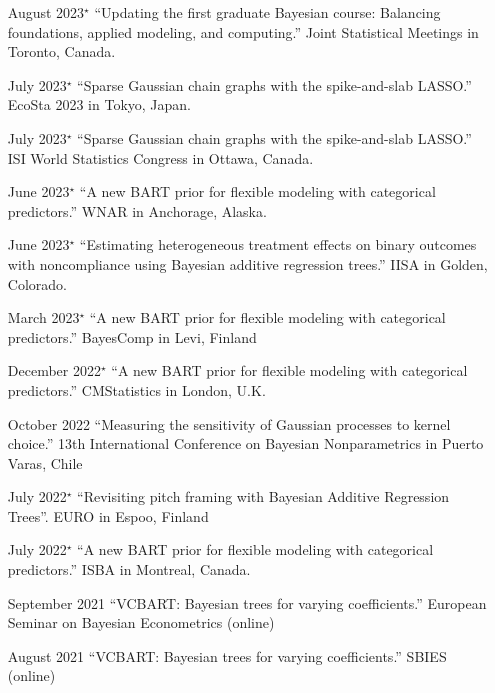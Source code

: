 \documentclass[margin]{res}
\begin{document}
\begin{resume}
\begin{itemize}
\item[August 2023$^{\star}$]{``Updating the first graduate Bayesian course: Balancing foundations, applied modeling, and computing.'' Joint Statistical Meetings in Toronto, Canada.}

\item[July 2023$^{\star}$]{``Sparse Gaussian chain graphs with the spike-and-slab LASSO.'' EcoSta 2023 in Tokyo, Japan.}

\item[July 2023$^{\star}$]{``Sparse Gaussian chain graphs with the spike-and-slab LASSO.'' ISI World Statistics Congress in Ottawa, Canada.}

\item[June 2023$^{\star}$]{``A new BART prior for flexible modeling with categorical predictors.'' WNAR in Anchorage, Alaska.}

\item[June 2023$^{\star}$]{``Estimating heterogeneous treatment effects on binary outcomes with noncompliance using Bayesian additive regression trees.'' IISA in Golden, Colorado.}

\item[March 2023$^{\star}$]{``A new BART prior for flexible modeling with categorical predictors.'' BayesComp in Levi, Finland}

\item[December 2022$^{\star}$]{``A new BART prior for flexible modeling with categorical predictors.'' CMStatistics in London, U.K.}

\item[October 2022]{``Measuring the sensitivity of Gaussian processes to kernel choice.'' 13th International Conference on Bayesian Nonparametrics in Puerto Varas, Chile}

\item[July 2022$^{\star}$]{``Revisiting pitch framing with Bayesian Additive Regression Trees''. EURO in Espoo, Finland}

\item[July 2022$^{\star}$]{``A new BART prior for flexible modeling with categorical predictors.'' ISBA in Montreal, Canada.}

\item[September 2021]{``VCBART: Bayesian trees for varying coefficients.'' European Seminar on Bayesian Econometrics (online)}

\item[August 2021]{``VCBART: Bayesian trees for varying coefficients.'' SBIES (online)}


\end{itemize}
\end{resume}
\end{document}

